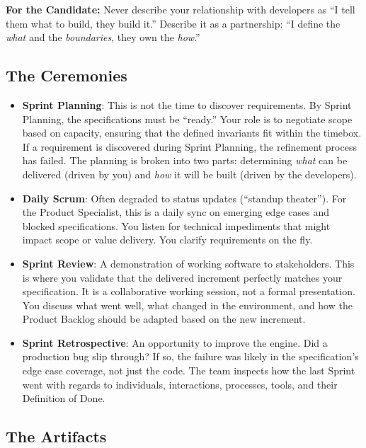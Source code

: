 \documentclass[
  11pt,
  openany,
  oneside]{book}
\providecommand{\tightlist}{%
  \setlength{\itemsep}{0pt}\setlength{\parskip}{0pt}}
\renewenvironment{quote}{\begin{customquote}}{\end{customquote}}
\begin{document}
\begin{quote}
\textbf{For the Candidate:} Never describe your relationship with
developers as ``I tell them what to build, they build it.'' Describe it
as a partnership: ``I define the \emph{what} and the \emph{boundaries},
they own the \emph{how}.''
\end{quote}

\subsection{The Ceremonies}\label{the-ceremonies}

\begin{itemize}
\tightlist
\item
  \textbf{Sprint Planning}: This is not the time to discover
  requirements. By Sprint Planning, the specifications must be
  ``ready.'' Your role is to negotiate scope based on capacity, ensuring
  that the defined invariants fit within the timebox. If a requirement
  is discovered during Sprint Planning, the refinement process has
  failed. The planning is broken into two parts: determining \emph{what}
  can be delivered (driven by you) and \emph{how} it will be built
  (driven by the developers).
\item
  \textbf{Daily Scrum}: Often degraded to status updates (``standup
  theater''). For the Product Specialist, this is a daily sync on
  emerging edge cases and blocked specifications. You listen for
  technical impediments that might impact scope or value delivery. You
  clarify requirements on the fly.
\item
  \textbf{Sprint Review}: A demonstration of working software to
  stakeholders. This is where you validate that the delivered increment
  perfectly matches your specification. It is a collaborative working
  session, not a formal presentation. You discuss what went well, what
  changed in the environment, and how the Product Backlog should be
  adapted based on the new increment.
\item
  \textbf{Sprint Retrospective}: An opportunity to improve the engine.
  Did a production bug slip through? If so, the failure was likely in
  the specification's edge case coverage, not just the code. The team
  inspects how the last Sprint went with regards to individuals,
  interactions, processes, tools, and their Definition of Done.
\end{itemize}

\subsection{The Artifacts}\label{the-artifacts}
\end{document}
